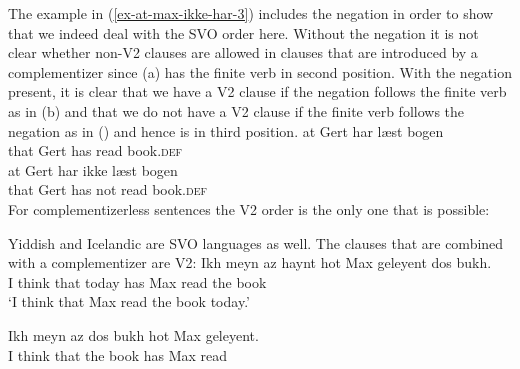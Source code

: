 \eal
{}
\zl
The example in (\ref{ex-at-max-ikke-har-3}) includes the negation in order to show that we indeed deal
with the SVO order here. Without the negation it is not clear whether non-V2 clauses are allowed in
clauses that are introduced by a complementizer since (a) has the finite verb in second
position. With the negation present, it is clear that we have a V2 clause if the negation follows
the finite verb as in (b) and that we do not have a V2 clause if the finite verb follows the negation as in
() and hence is in third position.
\eal
\settowidth{}
\ex 
\gll at Gert har læst bogen\\
     that Gert has read book.\textsc{def}\\
\ex 
\gll at   Gert har ikke læst bogen\\
     that Gert has not  read book.\textsc{def}\\
\zl 
For complementizerless sentences the V2 order is the only one that is possible:
\eal
\settowidth{}
\zl 


Yiddish and Icelandic are SVO languages as well. The clauses that are combined with a
complementizer are V2:
\eal
\ex
\gll Ikh meyn  az   haynt hot Max geleyent dos bukh.\footnotemark\\
     I think that today has Max read the book\\\yiddish
{}
\glt `I think that Max read the book today.'

\ex%
\gll Ikh meyn  az   dos bukh hot Max geleyent.\\
     I think that the book has Max read\\


